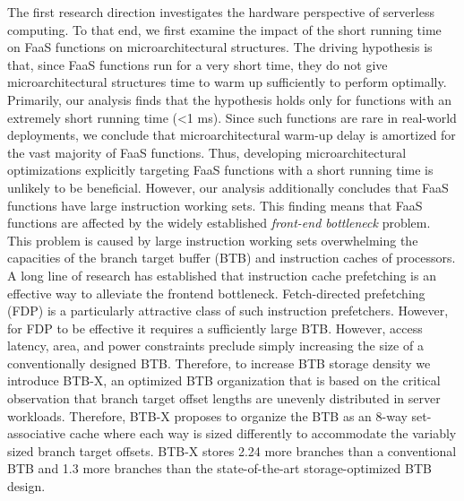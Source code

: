 \documentclass[../main.tex]{subfiles}
\begin{document}
The first research direction investigates the hardware perspective of
serverless computing. To that end, we first examine the impact of the
short running time on FaaS functions on microarchitectural
structures. The driving hypothesis is that, since FaaS functions run
for a very short time, they do not give microarchitectural structures
time to warm up sufficiently to perform optimally. Primarily, our
analysis finds that the hypothesis holds only for functions with an
extremely short running time (<1 ms). Since such functions are rare in
real-world deployments, we conclude that microarchitectural warm-up
delay is amortized for the vast majority of FaaS functions. Thus,
developing microarchitectural optimizations explicitly targeting FaaS
functions with a short running time is unlikely to be
beneficial. However, our analysis additionally concludes that
FaaS functions have large instruction working sets. This finding
means that FaaS functions are affected by the widely established
\emph{front-end bottleneck} problem. This problem is caused by large
instruction working sets overwhelming the capacities of the branch
target buffer (BTB) and instruction caches of processors. A long line
of research has established that instruction cache prefetching is an
effective way to alleviate the frontend bottleneck. Fetch-directed
prefetching (FDP) is a particularly attractive class of such
instruction prefetchers. However, for FDP to be effective it requires
a sufficiently large BTB. However, access latency, area, and power
constraints preclude simply increasing the size of a conventionally
designed BTB. Therefore, to increase BTB storage density we introduce
BTB-X, an optimized BTB organization that is based on the critical
observation that branch target offset lengths are unevenly distributed
in server workloads. Therefore, BTB-X proposes to organize the BTB as
an 8-way set-associative cache where each way is sized differently to
accommodate the variably sized branch target offsets. BTB-X stores
2.24\texttimes{} more branches than a conventional BTB and 1.3\texttimes{}
more branches than the state-of-the-art storage-optimized BTB design.
\end{document}
